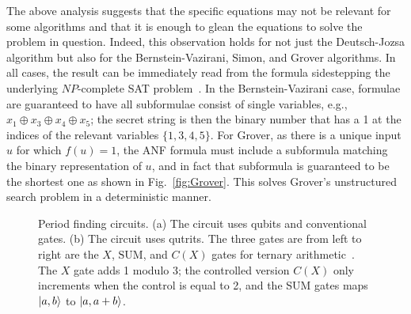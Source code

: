 \documentclass[aps,prl,twocolumn,superscriptaddress,floatfix,notitlepage]{revtex4-2}
\begin{document}
The above analysis suggests that the specific equations may
not be relevant for some algorithms and that it is enough to glean the equations
to solve the problem in question. Indeed, this observation holds for not just 
the Deutsch-Jozsa algorithm but also for the 
Bernstein-Vazirani, Simon, and Grover algorithms. In all cases,
the result can be immediately read from the formula sidestepping
the underlying $\mathit{NP}$-complete SAT
problem~\cite{4640789,Karp1972,10.1145/800157.805047}. In the
Bernstein-Vazirani case, formulae are guaranteed to have all subformulae consist of single variables, e.g., 
$x_1 \oplus x_3 \oplus x_4 \oplus x_5$; the secret string is then the
binary number that has a 1 at the indices of the relevant variables
$\{ 1,3,4,5 \}$. For Grover, as there is a unique
input $u$ for which $f(u) = 1$, the ANF formula must include a
subformula matching the binary representation of $u$, and in fact that
subformula is guaranteed to be the shortest one as shown in
Fig.~\ref{fig:Grover}. This solves Grover's unstructured search problem in a deterministic manner. 

\begin{figure}[H]
\centering
{}
\qquad\qquad 
{}
\caption{Period finding circuits. (a) The circuit uses qubits
and conventional gates. (b) The circuit  uses
  qutrits. The three gates are from left to right are the $X$,
  $\textrm{SUM}$, and $C(X)$ gates for ternary
  arithmetic~\cite{10.5555/3179473.3179481}. The $X$ gate adds 1
  modulo 3; the controlled version $C(X)$ only increments when the
  control is equal to 2, and the \textrm{SUM} gates maps $\ket{a,b}$
  to $\ket{a,a+b}$.}
\end{figure}
\end{document}
